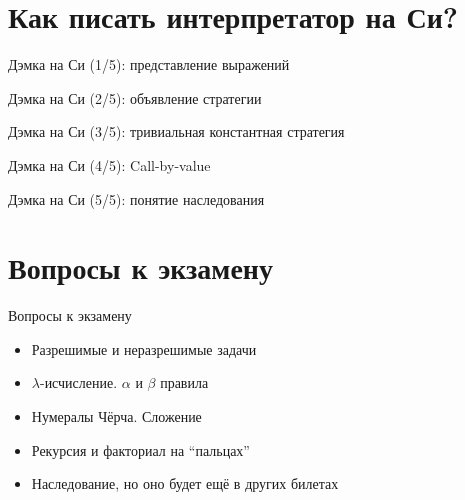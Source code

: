 \section{Как писать интерпретатор на Си?}
\begin{frame}{Дэмка на Си (1/5): представление выражений}
\cast
\end{frame}

\begin{frame}{Дэмка на Си (2/5): объявление стратегии}
\strat
\end{frame}

\begin{frame}{Дэмка на Си (3/5): тривиальная константная стратегия}
\nostrat
\end{frame}

\begin{frame}{Дэмка на Си (4/5): Call-by-value}
\cbvstrat
\end{frame}
\begin{frame}{Дэмка на Си (5/5): понятие наследования}
\inheritance
\end{frame}


\section{Вопросы к экзамену}
\begin{frame}{Вопросы к экзамену}
\begin{itemize}
  \item Разрешимые и неразрешимые задачи
  \item $\lambda$-исчисление. $\alpha$ и $\beta$ правила
  \item Нумералы Чёрча. Сложение
  \item Рекурсия и факториал на ``пальцах''
  \item Наследование, но оно будет ещё в других билетах
\end{itemize}
\end{frame}


